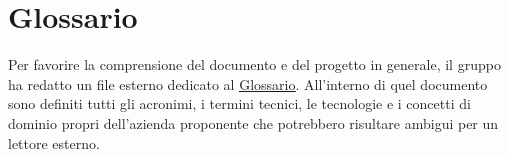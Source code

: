 \appendix
 
\section{Glossario}
 
Per favorire la comprensione del documento e del progetto in generale, il gruppo ha
redatto un file esterno dedicato al
\href{https://synergo-unit-unipd.github.io/Second-Brain/docs/CC/doc_gestionali/doc_interni/glossario/glossario.pdf}
     {\underline{Glossario}}. All'interno di quel documento sono definiti tutti gli
acronimi, i termini tecnici, le tecnologie e i concetti di dominio propri
dell'azienda proponente che potrebbero risultare ambigui per un lettore esterno.
 